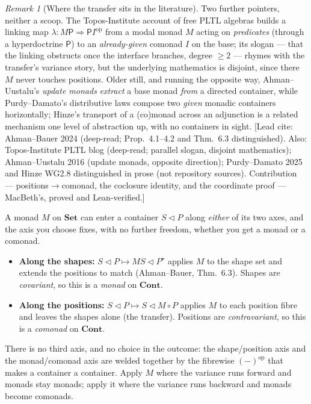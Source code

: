 \documentclass[11pt,a4paper]{book}
\newcommand{\Set}{\mathbf{Set}}
\newcommand{\Cont}{\mathbf{Cont}}
\newcommand{\cont}[2]{#1 \triangleleft #2}
\theoremstyle{plain}
\theoremstyle{definition}
\theoremstyle{remark}
\newtheorem{Remark}[Theorem]{Remark}
\newcommand{\prov}[1]{\hfill\textsf{\footnotesize[#1]}}
\begin{document}
\begin{Remark}[Where the transfer sits in the literature]
Two further pointers, neither a scoop. The Topos-Institute account of free PLTL algebras
\cite{ToposPLTL} builds a linking map $\lambda\colon M\mathsf P\Rightarrow\mathsf P I^{\mathrm{op}}$
from a modal monad $M$ acting on \emph{predicates} (through a hyperdoctrine $\mathsf P$) to an
\emph{already-given} comonad $I$ on the base; its slogan --- that the linking obstructs once the
interface branches, degree $\ge 2$ --- rhymes with the transfer's variance story, but the
underlying mathematics is disjoint, since there $M$ never touches positions. Older still, and
running the opposite way, Ahman--Uustalu's \emph{update monads} \cite{AU16} \emph{extract} a base
monad \emph{from} a directed container, while Purdy--Damato's distributive laws compose two
\emph{given} monadic containers horizontally; Hinze's transport of a (co)monad across an adjunction
is a related mechanism one level of abstraction up, with no containers in sight.
\prov{Lead cite: Ahman--Bauer 2024 \cite{AhmanBauer24} (deep-read; Prop.~4.1--4.2 and Thm.~6.3
distinguished). Also: Topos-Institute PLTL blog \cite{ToposPLTL} (deep-read; parallel slogan,
disjoint mathematics); Ahman--Uustalu 2016 \cite{AU16} (update monads, opposite direction);
Purdy--Damato 2025 and Hinze WG2.8 distinguished in prose (not repository sources). Contribution
--- positions$\to$comonad, the coclosure identity, and the coordinate proof --- MacBeth's, proved
and Lean-verified.}
\end{Remark}

\begin{teachbox}[Two ways to feed a $\Set$-monad into a container]
A monad $M$ on $\Set$ can enter a container $\cont S P$ along \emph{either} of its two axes, and the
axis you choose fixes, with no further freedom, whether you get a monad or a comonad.
\begin{itemize}[nosep]
  \item \textbf{Along the shapes:} $\cont S P\mapsto\cont{M S}{P^{\star}}$ applies $M$ to the shape
        set and extends the positions to match (Ahman--Bauer, Thm.~6.3). Shapes are
        \emph{covariant}, so this is a \emph{monad} on $\Cont$.
  \item \textbf{Along the positions:} $\cont S P\mapsto\cont S{M\circ P}$ applies $M$ to each
        position fibre and leaves the shapes alone (the transfer). Positions are
        \emph{contravariant}, so this is a \emph{comonad} on $\Cont$.
\end{itemize}
There is no third axis, and no choice in the outcome: the shape/position axis and the
monad/comonad axis are welded together by the fibrewise $(-)^{\mathrm{op}}$ that makes a container a
container. Apply $M$ where the variance runs forward and monads stay monads; apply it where the
variance runs backward and monads become comonads.
\end{teachbox}
\end{document}
